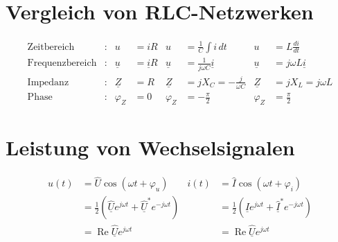 \documentclass[
  ngerman,
  letterpaper,
]{scrbook}
\begin{document}
\section{Vergleich von
RLC-Netzwerken}\label{vergleich-von-rlc-netzwerken}

\begin{align}
\mbox{Zeitbereich} &: & u &= i R &  u &= \frac{1}{C} \int i\, dt & u &= L \frac{di}{dt} \\
\mbox{Frequenzbereich} &: & \underline{u} &= \underline{i} R &
\underline{u} &= \frac{1}{j \omega C} \underline{i} &
\underline{u} &= j \omega L \underline{i} \\
\mbox{Impedanz} &: & \underline{Z} &= R &
\underline{Z} &= j X_C = -\frac{j}{\omega C} &
\underline{Z} &= j X_L = j \omega L \\
\mbox{Phase} &: & \varphi_Z&= 0 & \varphi_Z &= -\frac{\pi}{2} & \varphi_Z &= \frac{\pi}{2}
\end{align}

\section{Leistung von
Wechselsignalen}\label{leistung-von-wechselsignalen}

\begin{tcolorbox}[enhanced jigsaw, titlerule=0mm, rightrule=.15mm, toprule=.15mm, colback=white, toptitle=1mm, bottomrule=.15mm, coltitle=black, leftrule=.75mm, arc=.35mm, colbacktitle=quarto-callout-note-color!10!white, opacityback=0, bottomtitle=1mm, colframe=quarto-callout-note-color-frame, opacitybacktitle=0.6, breakable, title=\textcolor{quarto-callout-note-color}{\faInfo}\hspace{0.5em}{Harmonische Anregung}, left=2mm]

\begin{align}
u(t) &= \hat{U} \cos(\omega t + \varphi_u) & i(t) &= \hat{I} \cos(\omega t + \varphi_i) \\
&= \frac{1}{2} \left( \underline{\hat{U}} e^{j \omega t} + \underline{\hat{U}}^* e^{-j \omega t}\right) & 
&= \frac{1}{2} \left( \underline{\hat{I}} e^{j \omega t} +  \underline{\hat{I}}^* e^{-j \omega t}\right) \\
&= \operatorname{Re}{\underline{\hat{U}}e^{j \omega t}} & &= \operatorname{Re}{\underline{\hat{U}}e^{j \omega t}}
\end{align}

\end{tcolorbox}
\end{document}
